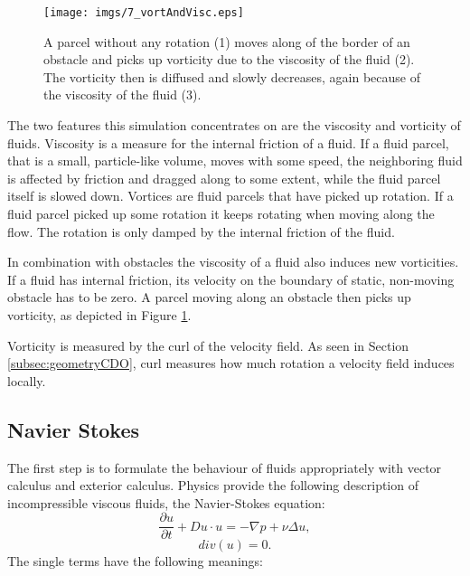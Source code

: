 \begin{figure}%
\begin{center}
\texttt{[image: imgs/7\_vortAndVisc.eps]}%
\end{center}
\caption{A parcel without any rotation (1) moves along of the border of an obstacle and picks up vorticity due to the viscosity of the fluid (2). The vorticity then is diffused and slowly decreases, again because of the viscosity of the fluid (3).}%
\label{fig:fd_vortAndVisc}%
\end{figure}

The two features this simulation concentrates on are the viscosity and vorticity of fluids. Viscosity is a measure for the internal friction of a fluid. If a fluid parcel, that is a small, particle-like volume, moves with some speed, the neighboring fluid is affected by friction and dragged along to some extent, while the fluid parcel itself is slowed down. 
Vortices are fluid parcels that have picked up rotation. If a fluid parcel picked up some rotation it keeps rotating when moving along the flow. The rotation is only damped by the internal friction of the fluid. 

In combination with obstacles the viscosity of a fluid also induces new vorticities. If a fluid has internal friction, its velocity on the boundary of static, non-moving obstacle has to be zero. A parcel moving  along an obstacle then picks up vorticity, as depicted in Figure \ref{fig:fd_vortAndVisc}.

Vorticity is measured by the curl of the velocity field. As seen in Section \ref{subsec:geometryCDO},  curl measures how much rotation a velocity field induces locally.

\subsection{Navier Stokes}

The first step is to formulate the behaviour of fluids appropriately with vector calculus and exterior calculus. 
Physics provide the following description of incompressible viscous fluids, the Navier-Stokes equation:
\[\frac{\partial u}{\partial t} + Du \cdot u = -\nabla p + \nu \Delta u,\]
\begin{equation}div(u) = 0\label{eq:NS}.\end{equation} 
The single terms have the following meanings:

